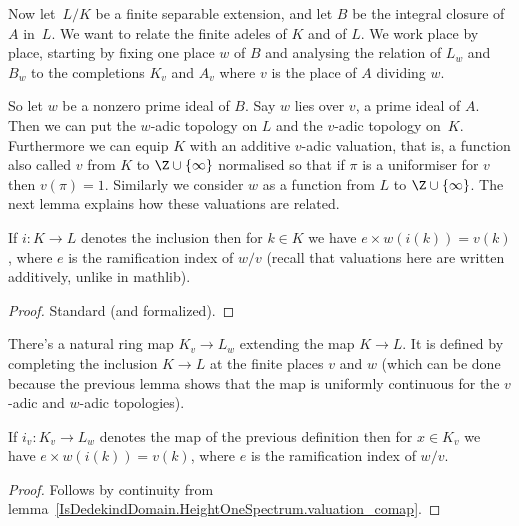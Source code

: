 Now let~$L/K$ be a finite separable extension, and let $B$ be the integral closure of~$A$ in~$L$.
We want to relate the finite adeles of $K$ and of $L$. We work place by place, starting by fixing
one place $w$ of $B$ and analysing the relation of $L_w$ and $B_w$ to the completions $K_v$
and $A_v$ where $v$ is the place of $A$ dividing $w$.

So let $w$ be a nonzero prime ideal of $B$. Say $w$ lies over $v$, a prime ideal of $A$.
Then we can put the $w$-adic topology on $L$ and the $v$-adic topology on~$K$. Furthermore
we can equip $K$ with an additive $v$-adic valuation, that is,
a function also called $v$ from $K$ to $\Z\cup\{\infty\}$ normalised so that if $\pi$ is a uniformiser
for $v$ then $v(\pi)=1$. Similarly we consider $w$ as a function from $L$ to $\Z\cup\{\infty\}$.
The next lemma explains how these valuations are related.

\begin{lemma}
  \label{IsDedekindDomain.HeightOneSpectrum.valuation_comap}
  \leanok
  If $i:K\to L$ denotes the inclusion then for $k\in K$ we have
  $e\times w(i(k))=v(k)$, where $e$ is the ramification index of $w/v$
  (recall that valuations here are written additively, unlike in mathlib).
\end{lemma}
\begin{proof}
  \leanok
  Standard (and formalized).
\end{proof}

\begin{definition}
  \label{IsDedekindDomain.HeightOneSpectrum.adicCompletionComapSemialgHom}
  \leanok
  There's a natural ring map $K_v\to L_w$ extending the map $K\to L$.
  It is defined by completing
  the inclusion $K\to L$ at the finite places $v$ and $w$ (which can be done
  because the previous lemma shows that the map is uniformly continuous for the $v$-adic
  and $w$-adic topologies).
\end{definition}

\begin{lemma}
  \label{IsDedekindDomain.HeightOneSpectrum.valued_adicCompletionComap}
  \leanok
  If $i_v:K_v\to L_w$ denotes the map of the previous definition
  then for $x\in K_v$ we have
  $e\times w(i(k))=v(k)$, where $e$ is the ramification index of $w/v$.
\end{lemma}
\begin{proof}
  Follows by continuity from lemma~\ref{IsDedekindDomain.HeightOneSpectrum.valuation_comap}.
\end{proof}

